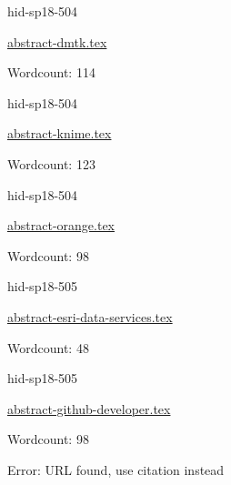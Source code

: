 

\begin{IU}

hid-sp18-504

\href{https://github.com/cloudmesh-community/hid-sp18-504/blob/master//technology/abstract-dmtk.tex}{abstract-dmtk.tex}

 

Wordcount: 114

\end{IU}



\begin{IU}

hid-sp18-504

\href{https://github.com/cloudmesh-community/hid-sp18-504/blob/master//technology/abstract-knime.tex}{abstract-knime.tex}

 

Wordcount: 123

\end{IU}



\begin{IU}

hid-sp18-504

\href{https://github.com/cloudmesh-community/hid-sp18-504/blob/master//technology/abstract-orange.tex}{abstract-orange.tex}

 

Wordcount: 98

\end{IU}



\begin{IU}

hid-sp18-505

\href{https://github.com/cloudmesh-community/hid-sp18-505/blob/master//technology/abstract-esri-data-services.tex}{abstract-esri-data-services.tex}

 

Wordcount: 48

\end{IU}



\begin{IU}

hid-sp18-505

\href{https://github.com/cloudmesh-community/hid-sp18-505/blob/master//technology/abstract-github-developer.tex}{abstract-github-developer.tex}

 

Wordcount: 98

Error: URL found, use citation instead
\end{IU}

